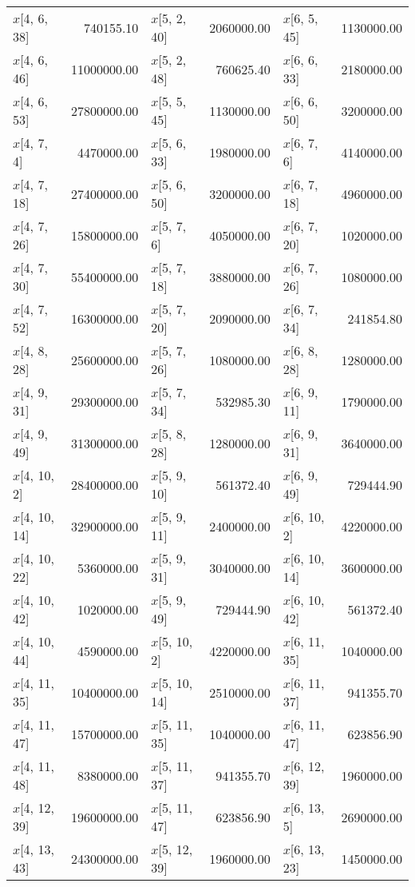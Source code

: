 \begin{longtable}{lrlrlr}
$x$[4, 6, 38] & 740155.10 & $x$[5, 2, 40] & 2060000.00 & $x$[6, 5, 45] & 1130000.00 \\
$x$[4, 6, 46] & 11000000.00 & $x$[5, 2, 48] & 760625.40 & $x$[6, 6, 33] & 2180000.00 \\
$x$[4, 6, 53] & 27800000.00 & $x$[5, 5, 45] & 1130000.00 & $x$[6, 6, 50] & 3200000.00 \\
$x$[4, 7, 4] & 4470000.00 & $x$[5, 6, 33] & 1980000.00 & $x$[6, 7, 6] & 4140000.00 \\
$x$[4, 7, 18] & 27400000.00 & $x$[5, 6, 50] & 3200000.00 & $x$[6, 7, 18] & 4960000.00 \\
$x$[4, 7, 26] & 15800000.00 & $x$[5, 7, 6] & 4050000.00 & $x$[6, 7, 20] & 1020000.00 \\
$x$[4, 7, 30] & 55400000.00 & $x$[5, 7, 18] & 3880000.00 & $x$[6, 7, 26] & 1080000.00 \\
$x$[4, 7, 52] & 16300000.00 & $x$[5, 7, 20] & 2090000.00 & $x$[6, 7, 34] & 241854.80 \\
$x$[4, 8, 28] & 25600000.00 & $x$[5, 7, 26] & 1080000.00 & $x$[6, 8, 28] & 1280000.00 \\
$x$[4, 9, 31] & 29300000.00 & $x$[5, 7, 34] & 532985.30 & $x$[6, 9, 11] & 1790000.00 \\
$x$[4, 9, 49] & 31300000.00 & $x$[5, 8, 28] & 1280000.00 & $x$[6, 9, 31] & 3640000.00 \\
$x$[4, 10, 2] & 28400000.00 & $x$[5, 9, 10] & 561372.40 & $x$[6, 9, 49] & 729444.90 \\
$x$[4, 10, 14] & 32900000.00 & $x$[5, 9, 11] & 2400000.00 & $x$[6, 10, 2] & 4220000.00 \\
$x$[4, 10, 22] & 5360000.00 & $x$[5, 9, 31] & 3040000.00 & $x$[6, 10, 14] & 3600000.00 \\
$x$[4, 10, 42] & 1020000.00 & $x$[5, 9, 49] & 729444.90 & $x$[6, 10, 42] & 561372.40 \\
$x$[4, 10, 44] & 4590000.00 & $x$[5, 10, 2] & 4220000.00 & $x$[6, 11, 35] & 1040000.00 \\
$x$[4, 11, 35] & 10400000.00 & $x$[5, 10, 14] & 2510000.00 & $x$[6, 11, 37] & 941355.70 \\
$x$[4, 11, 47] & 15700000.00 & $x$[5, 11, 35] & 1040000.00 & $x$[6, 11, 47] & 623856.90 \\
$x$[4, 11, 48] & 8380000.00 & $x$[5, 11, 37] & 941355.70 & $x$[6, 12, 39] & 1960000.00 \\
$x$[4, 12, 39] & 19600000.00 & $x$[5, 11, 47] & 623856.90 & $x$[6, 13, 5] & 2690000.00 \\
$x$[4, 13, 43] & 24300000.00 & $x$[5, 12, 39] & 1960000.00 & $x$[6, 13, 23] & 1450000.00 \\

\end{longtable}
